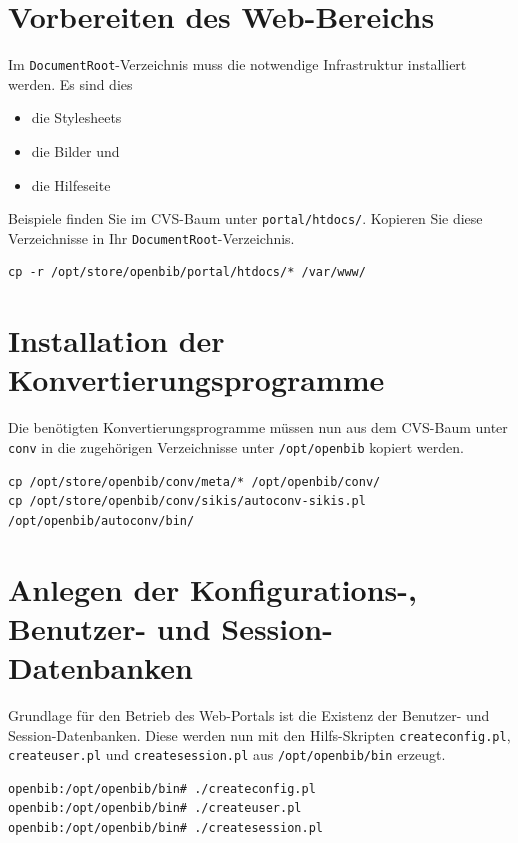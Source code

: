 \documentclass[11pt, twoside, a4paper, BCOR8mm, DIV12, bibtotoc,idxtotoc]{scrbook}
\begin{document}
\section{Vorbereiten des Web-Bereichs}

Im \texttt{DocumentRoot}-Verzeichnis muss die notwendige Infrastruktur
installiert werden. Es sind dies

\begin{itemize}
\item die Stylesheets
\item die Bilder und
\item die Hilfeseite
\end{itemize}

Beispiele finden Sie im CVS-Baum unter
\texttt{portal/htdocs/}. Kopieren Sie diese Verzeichnisse in Ihr
\texttt{DocumentRoot}-Verzeichnis.

\begin{verbatim}
cp -r /opt/store/openbib/portal/htdocs/* /var/www/
\end{verbatim}


\section{Installation der Konvertierungsprogramme}

Die benötigten Konvertierungsprogramme müssen nun aus dem CVS-Baum
unter \texttt{conv} in die zugehörigen Verzeichnisse unter
\texttt{/opt/openbib} kopiert werden.

\begin{verbatim}
cp /opt/store/openbib/conv/meta/* /opt/openbib/conv/
cp /opt/store/openbib/conv/sikis/autoconv-sikis.pl /opt/openbib/autoconv/bin/
\end{verbatim}

\section{Anlegen der Konfigurations-, Benutzer- und Session-Datenbanken}

Grundlage für den Betrieb des Web-Portals ist die Existenz der
Benutzer- und Session-Datenbanken. Diese werden nun mit den
Hilfs-Skripten \texttt{createconfig.pl}, \texttt{createuser.pl} und
\texttt{createsession.pl} aus \texttt{/opt/openbib/bin} erzeugt.

\begin{verbatim}
openbib:/opt/openbib/bin# ./createconfig.pl
openbib:/opt/openbib/bin# ./createuser.pl
openbib:/opt/openbib/bin# ./createsession.pl
\end{verbatim}
\end{document}
